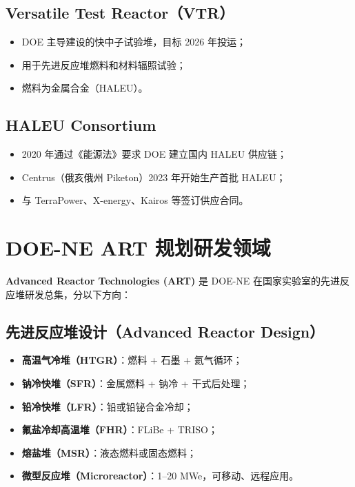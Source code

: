 \documentclass[
  UTF8,
  scheme=plain,
  fontsize=10pt,
  openany
]{ctexbook}
\begin{document}
\subsection{Versatile Test
Reactor（VTR）}\label{versatile-test-reactorvtr}

\begin{itemize}
\tightlist
\item
  DOE 主导建设的快中子试验堆，目标 2026 年投运；
\item
  用于先进反应堆燃料和材料辐照试验；
\item
  燃料为金属合金（HALEU）。
\end{itemize}

\subsection{HALEU Consortium}\label{haleu-consortium}

\begin{itemize}
\tightlist
\item
  2020 年通过《能源法》要求 DOE 建立国内 HALEU 供应链；
\item
  Centrus（俄亥俄州 Piketon）2023 年开始生产首批 HALEU；
\item
  与 TerraPower、X-energy、Kairos 等签订供应合同。
\end{itemize}

\section{DOE-NE ART
规划研发领域}\label{doe-ne-art-ux89c4ux5212ux7814ux53d1ux9886ux57df}

\textbf{Advanced Reactor Technologies (ART)} 是 DOE-NE
在国家实验室的先进反应堆研发总集，分以下方向：

\subsection{先进反应堆设计（Advanced Reactor
Design）}\label{ux5148ux8fdbux53cdux5e94ux5806ux8bbeux8ba1advanced-reactor-design}

\begin{itemize}
\tightlist
\item
  \textbf{高温气冷堆（HTGR）}：燃料 + 石墨 + 氦气循环；
\item
  \textbf{钠冷快堆（SFR）}：金属燃料 + 钠冷 + 干式后处理；
\item
  \textbf{铅冷快堆（LFR）}：铅或铅铋合金冷却；
\item
  \textbf{氟盐冷却高温堆（FHR）}：FLiBe + TRISO；
\item
  \textbf{熔盐堆（MSR）}：液态燃料或固态燃料；
\item
  \textbf{微型反应堆（Microreactor）}：1--20 MWe，可移动、远程应用。
\end{itemize}
\end{document}
